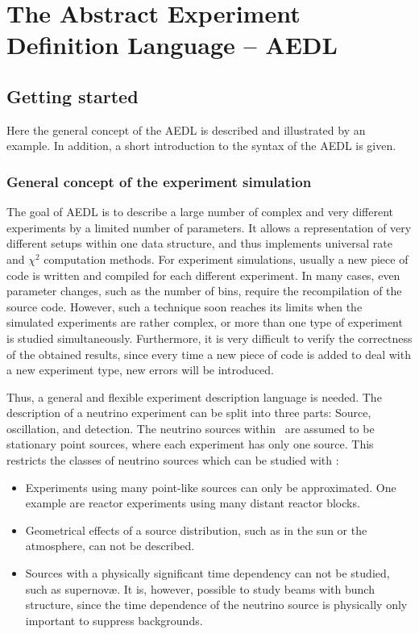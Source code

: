 
\part{The Abstract Experiment Definition Language -- AEDL}
\label{part:2}

\chapter{Getting started}

Here the general concept of the AEDL is described and illustrated by an example. In addition, a short introduction to the syntax of the AEDL is given.

\section{General concept of the experiment simulation}

The goal of AEDL is to describe a large number of complex and very 
different experiments by a limited number of parameters. It allows a
representation of very different setups within one data structure, and thus implements universal rate and $\chi^2$ computation methods. For experiment simulations, usually a new piece of code is written and compiled
for each different experiment. In many cases, even parameter changes, such as
the number of bins, require the recompilation of the source code. 
However, such a technique soon reaches its limits when the simulated experiments are rather complex, or more than one type of experiment is studied simultaneously. Furthermore, it is very difficult to verify the correctness of the obtained results, since every time a new piece of code is added to 
deal with a new experiment type, new errors will be introduced.

Thus, a general and flexible experiment description language is needed.  
The description of a neutrino experiment can be split into three parts: Source, oscillation, and detection. The neutrino sources within \GLOBES\ 
are assumed to be stationary point sources, where each experiment has only 
one source. This restricts the classes of neutrino sources which can be studied with \GLOBES :
\begin{itemize}
\item
 Experiments using many point-like sources can only be approximated. One example are reactor experiments using many distant reactor blocks.
\item
 Geometrical effects of a source distribution, such as in the sun or the atmosphere, can not be described.
\item
 Sources with a physically significant time dependency  can not be studied, such as  supernov\ae. It is, however, possible
to study beams with bunch structure, since the time dependence of the
neutrino source is physically only important to suppress backgrounds. 
\end{itemize}

